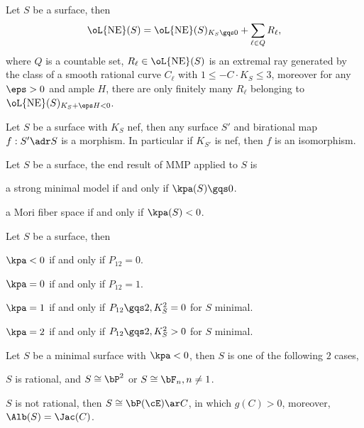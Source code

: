 \documentclass[a4paper, twoside]{article}
\begin{document}
\begin{thm}
	Let $S$ be a surface, then
	\[
		\oL{\mathrm{NE}}(S)=\oL{\mathrm{NE}}(S)_{K_{S}\gqs0}+\sum_{\ell\in Q}R_{\ell},
	\]
	where $Q$ is a countable set, $R_{\ell}\in\oL{\mathrm{NE}}(S)$ is an extremal ray generated by the class of a smooth rational curve $C_{\ell}$ with $1\leq-C\cdot K_{S}\leq3$, moreover for any $\eps>0$ and ample $H$, there are only finitely many $R_{\ell}$ belonging to $\oL{\mathrm{NE}}(S)_{K_{S}+\eps H<0}$.
\end{thm}

\begin{thm}
	Let $S$ be a surface with $K_{S}$ nef, then any surface $S'$ and birational map $f:S'\adr S$ is a morphism. In particular if $K_{S'}$ is nef, then $f$ is an isomorphism.
\end{thm}

\begin{thm}
	Let $S$ be a surface, the end result of MMP applied to $S$ is
	\begin{enr}
		\item a strong minimal model if and only if $\kpa(S)\gqs0$.
		\item a Mori fiber space if and only if $\kpa(S)<0$.
	\end{enr}
\end{thm}



\begin{thm}[$P_{12}$-theorem]
	Let $S$ be a surface, then
	\begin{enr}
		\item $\kpa<0$ if and only if $P_{12}=0$.
		\item $\kpa=0$ if and only if $P_{12}=1$.
		\item $\kpa=1$ if and only if $P_{12}\gqs2, K_{S}^{2}=0$ for $S$ minimal.
		\item $\kpa=2$ if and only if $P_{12}\gqs2, K_{S}^{2}>0$ for $S$ minimal.
	\end{enr}
\end{thm}

\begin{thm}
	Let $S$ be a minimal surface with $\kpa<0$, then $S$ is one of the following $2$ cases,
	\begin{enr}
		\item $S$ is rational, and $S\cong\bP^{2}$ or $S\cong\bF_{n}, n\neq1$.
		\item $S$ is not rational, then $S\cong\bP(\cE)\ar C$, in which $g(C)>0$, moreover, $\Alb(S)=\Jac(C)$.
	\end{enr}
\end{thm}
\end{document}
